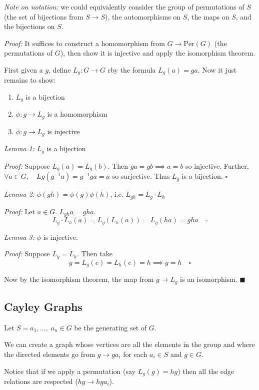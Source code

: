 \documentclass[12pt]{report}
\renewcommand{\indent}{\hspace*{0.5in}}
\begin{document}
        \emph{Note on notation:} we could equivalently consider the group of permutations of $S$ (the set of bijections from $S \to S$), the automorphisms on $S$, the maps on $S$, and the bijections on $S$. 

        \emph{Proof:} It suffices to construct a homomorphism from $G \to \text{Per}(G)$ (the permutations of $G$), then show it is injective and apply the isomorphism theorem.

        First given a $g$, define $L_g: G \to G$ rby the formula $L_g(a) = ga$. Now it just remains to show:
        \begin{enumerate}
            \item $L_g$ is a bijection 
            \item $\phi: g \to L_g$ is a homomorphism
            \item $\phi: g \to L_g$ is injective 
        \end{enumerate}

        \indent \emph{Lemma 1:} $L_g$ is a bijection 

        \indent \emph{Proof:} Suppose $L_g(a) = L_g(b)$. Then $ga = gb \implies a = b$ so injective. Further, $\forall a \in G, \quad Lg(g^{-1}a) = g^{-1}ga = a$ so surjective. Thus $L_g$ is a bijection. $\square$

        \indent \emph{Lemma 2:} $\phi(gh) = \phi(g) \phi(h)$, i.e. $L_{gh} = L_g \cdot L_h$

        \indent \emph{Proof:} Let $a \in G$. $L_{gh}a = gha$. 
        \[L_g\cdot L_h(a) = L_g(L_h(a)) = L_g(ha) = gha \quad \square\] 

        \indent \emph{Lemma 3:} $\phi$ is injective. 

        \indent \emph{Proof:} Suppose $L_g = L_h$. Then take 
        \[g = L_g(e) = L_h(e) = h \implies g = h \quad \square\]

        Now by the isomorphism theorem, the map from $g \to L_g$ is an isomorphism. $\blacksquare$

    \subsection*{Cayley Graphs}
        Let $S = a_1, \dots,\; a_n \in G$ be the generating set of $G$. 

        We can create a graph whose vertices are all the elements in the group and where the directed elements go from $g \to ga_i$ for each $a_i \in S$ and $g \in G$. 

        Notice that if we apply a permutation (say $L_g(g) = hg$) then all the edge relations are respected ($hg \to hga_i$). 
\end{document}
